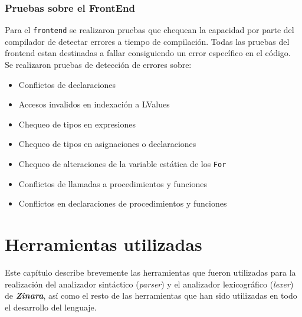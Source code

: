 \documentclass[12pt, spanish]{report}
\begin{document}
\subsection{Pruebas sobre el FrontEnd}
\label{sec:pruebas:frontend}

Para el \texttt{frontend} se realizaron pruebas que chequean la
capacidad por parte del compilador de detectar errores a tiempo de
compilación. Todas las pruebas del frontend estan destinadas a fallar
consiguiendo un error específico en el código.\\

Se realizaron pruebas de detección de errores sobre:

\begin{itemize}
\item Conflictos de declaraciones
\item Accesos invalidos en indexación a LValues
\item Chequeo de tipos en expresiones
\item Chequeo de tipos en asignaciones o declaraciones
\item Chequeo de alteraciones de la variable estática de los \texttt{For}
\item Conflictos de llamadas a procedimientos y funciones
\item Conflictos en declaraciones de procedimientos y funciones
\end{itemize}

\chapter{Herramientas utilizadas}
\label{sec:herramientas}
Este cap\'itulo describe brevemente las herramientas que fueron
utilizadas para la realizaci\'on del analizador sint\'actico
(\emph{parser}) y el analizador lexicogr\'afico (\emph{lexer}) de
\emph{\textbf{Zinara}}, as\'i como el resto de las herramientas que han
sido utilizadas en todo el desarrollo del lenguaje.
\end{document}
